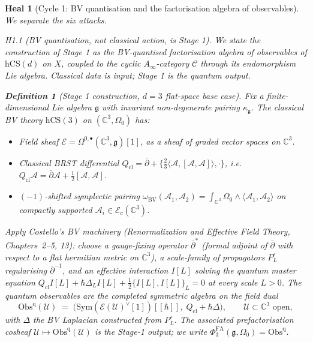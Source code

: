 \documentclass[11pt]{article}
\newtheorem*{heal}{Heal}
\theoremstyle{definition}
\newtheorem{definition}[theorem]{Definition}
\providecommand{\CC}{\mathbb{C}}
\providecommand{\fg}{\mathfrak{g}}
\providecommand{\hbarb}{\hbar}
\providecommand{\cA}{\mathcal{A}}
\providecommand{\cE}{\mathcal{E}}
\providecommand{\cC}{\mathcal{C}}
\providecommand{\cU}{\mathcal{U}}
\providecommand{\Obs}{\mathrm{Obs}}
\providecommand{\Sym}{\mathrm{Sym}}
\providecommand{\hCS}{\mathrm{hCS}}
\providecommand{\BV}{\mathrm{BV}}
\providecommand{\FA}{\mathrm{FA}}
\begin{document}
\begin{heal}[Cycle 1: BV quantisation and the factorisation algebra of observables]
We separate the six attacks.

\emph{H1.1 (BV quantisation, not classical action, is Stage 1).} We
state the construction of Stage 1 as the BV-quantised factorisation
algebra of observables of $\hCS(d)$ on $X$, coupled to the cyclic
$A_\infty$-category $\cC$ through its endomorphism Lie algebra.
Classical data is \emph{input}; Stage 1 is the \emph{quantum output}.

\begin{definition}[Stage 1 construction, $d=3$ flat-space base case]
\label{def:stage1-flat}
Fix a finite-dimensional Lie algebra $\fg$ with invariant non-degenerate
pairing $\kappa_\fg$. The classical BV theory $\hCS(3)$ on $(\CC^3, \Omega_0)$
has:
\begin{itemize}[leftmargin=2em]
  \item Field sheaf $\cE = \Omega^{0,\bullet}(\CC^3,\fg)[1]$, as a
        sheaf of graded vector spaces on $\CC^3$.
  \item Classical BRST differential $Q_{\mathrm{cl}} = \bar\partial +
        \{\tfrac{2}{3}\langle\cA,[\cA,\cA]\rangle, \cdot\}$, i.e.\
        $Q_{\mathrm{cl}}\cA = \bar\partial\cA + \tfrac{1}{2}[\cA,\cA]$.
  \item $(-1)$-shifted symplectic pairing
        $\omega_{\BV}(\cA_1, \cA_2) = \int_{\CC^3} \Omega_0 \wedge
        \langle \cA_1, \cA_2\rangle$ on compactly supported
        $\cA_i \in \cE_c(\CC^3)$.
\end{itemize}
Apply Costello's BV machinery (\emph{Renormalization and Effective
Field Theory}, Chapters~2--5, 13): choose a gauge-fixing operator
$\bar\partial^*$ (formal adjoint of $\bar\partial$ with respect to a
flat hermitian metric on $\CC^3$), a scale-family of propagators
$P_L^\varepsilon$ regularising $\bar\partial^{-1}$, and an effective
interaction $I[L]$ solving the quantum master equation
$Q_{\mathrm{cl}}I[L] + \hbarb \Delta_L I[L] + \tfrac{1}{2}\{I[L], I[L]\}_L = 0$
at every scale $L > 0$. The quantum observables are the completed
symmetric algebra on the field dual
\[
  \Obs^{\mathrm{q}}(\cU)
  \;=\; \bigl(\Sym(\cE(\cU)^\vee[1])[[\hbarb]], \; Q_{\mathrm{cl}} + \hbarb\Delta\bigr),
  \qquad \cU\subset\CC^3 \text{ open},
\]
with $\Delta$ the BV Laplacian constructed from $P_L^\varepsilon$. The
associated prefactorisation cosheaf $\cU\mapsto\Obs^{\mathrm{q}}(\cU)$
is the Stage-1 output; we write $\Phi^{\FA}_3(\fg, \Omega_0) =
\Obs^{\mathrm{q}}$.
\end{definition}


\end{heal}
\end{document}
